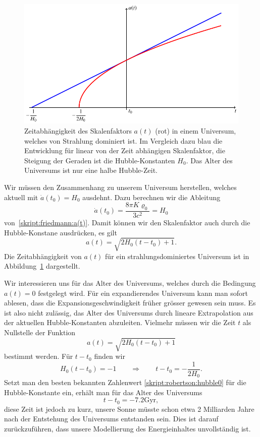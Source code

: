 \begin{figure}
\centering
\includegraphics{chapters/tikz/friedmann-strahlung.pdf}
\caption{Zeitabhängigkeit des Skalenfaktors $a(t)$ ({\color{red}rot})
in einem Universum, welches von Strahlung dominiert ist.
Im Vergleich dazu {\color{blue}blau} die Entwicklung für linear von der
Zeit abhängigen Skalenfaktor, die Steigung der Geraden ist die
Hubble-Konstanten $H_0$.
Das Alter des Universums ist nur eine halbe Hubble-Zeit.
\label{skript:friedmann:graph:strahlung}}
\end{figure}

Wir müssen den Zusammenhang zu unserem Universum herstellen, welches
aktuell mit $\dot a(t_0)= H_0$ ausdehnt.
Dazu berechnen wir die Ableitung
\[
\dot a(t_0)=\frac{8\pi K\varrho_0}{3c^2}=H_0
\]
von~\eqref{skript:friedmann:a(t)}.
Damit können wir den Skalenfaktor auch durch die Hubble-Konstane ausdrücken,
es gilt
\begin{equation}
a(t)=\sqrt{2H_0(t-t_0)+1}.
\label{skript:friedmann:a(t):strahlung}
\end{equation}
Die Zeitabhängigkeit von $a(t)$ für ein strahlungsdominiertes Universum
ist in Abbildung~\ref{skript:friedmann:graph:strahlung} dargestellt.

Wir interessieren uns für das Alter des Universums, welches durch
die Bedingung $a(t)=0$ festgelegt wird.
Für ein expandierendes Universum kann man sofort ablesen, dass
die Expansionsgeschwindigkeit früher grösser gewesen sein muss.
Es ist also nicht zulässig, das Alter des Universums durch lineare
Extrapolation aus der aktuellen Hubble-Konstanten abzuleiten.
Vielmehr müssen wir die Zeit $t$ als Nullstelle der Funktion
\[
a(t)=\sqrt{2H_0(t-t_0)+1}
\]
bestimmt werden.
Für $t-t_0$ finden wir
\[
H_0(t-t_0)
=
-1
\qquad\Rightarrow\qquad
t-t_0 = -\frac1{2H_0}.
\]
Setzt man den besten bekannten Zahlenwert
\eqref{skript:robertson:hubble0}
für die Hubble-Konstante ein,
erhält man für das Alter des Universums
\[
t-t_0=-7.2\text{Gyr},
\]
diese Zeit ist jedoch zu kurz, unsere Sonne müsste schon etwa
2 Milliarden Jahre nach der Entstehung des Universums entstanden
sein.
Dies ist darauf zurückzuführen, dass unsere Modellierung des
Energieinhaltes unvollständig ist.



